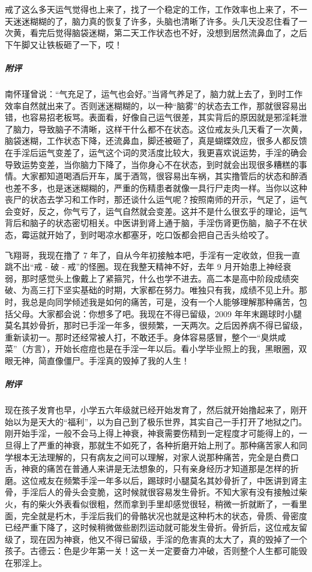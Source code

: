 \begin{case}
    戒了这么多天运气觉得也上来了，找了一个稳定的工作，工作效率也上来了，不一天迷迷糊糊的了，脑力真的恢复了许多，头脑也清晰了许多。头几天没忍住看了一次黄，看完后觉得脑袋迷糊，第二天工作状态也不好，没想到居然流鼻血了，之后下午脚又让铁板砸了一下，哎！
    \subparagraph{附评} 南怀瑾曾说：“气充足了，运气也会好。”当肾气养足了，脑力就上去了，到时工作效率自然就出来了。否则迷迷糊糊的，以一种“脑雾”的状态去工作，那就很容易出错，也容易招老板骂。表面看，好像自己运气很差，其实背后的原因就是邪淫耗泄了脑力，导致脑子不清晰，这样干什么都不在状态。这位戒友头几天看了一次黄，脑袋迷糊，工作状态下降，还流鼻血，脚还被砸了，真是蝴蝶效应，很多人都反馈在手淫后运气变差了，运气这个词的灵活度比较大，我更喜欢说运势，手淫的确会导致运势变差，当你脑力下降了，当你身心不在状态，到时就会出现很多糟糕的事情。大家都知道喝酒后开车，属于酒驾，很容易出车祸，其实撸管后的状态和醉酒也差不多，也是迷迷糊糊的，严重的伤精患者就像一具行尸走肉一样。当你以这种丧尸的状态去学习和工作时，那还谈什么运气呢？按照南师的开示，气足了，运气会变好，反之，你气亏了，运气自然就会变差。这并不是什么很玄乎的理论，运气背后和脑子的状态密切相关。中医讲到肾上通于脑，手淫伤肾更伤脑，脑子不在状态，霉运就开始了，到时喝凉水都塞牙，吃口饭都会把自己舌头给咬了。
\end{case}

\begin{case}
    飞翔哥，我现在撸了 7 年了，自从今年初接触本吧，手淫有一定收敛，但我一直跳不出“戒 - 破 - 戒”的怪圈。现在我整天精神不好，去年 9 月开始患上神经衰弱，那时感觉头上像戴上了紧箍咒，什么也学不进去。高二本是高中阶段成绩突破、为高三打下坚实基础的时期，大家都在努力。唯独只有我，成绩不见上升。那时，我总是向同学倾述我是如何的痛苦，可是，没有一个人能够理解那种痛苦，包括父母。大家都会说：你想多了吧。我现在不得已留级，2009 年年末踢球时小腿莫名其妙骨折，那时已手淫一年多，很频繁，一天两次。之后因养病不得已留级，重新读初一。那时还经常被人打，不敢还手。身体容易感冒，整个一“臭烘咸菜”（方言），开始长痘痘也是在手淫一年以后。看小学毕业照上的我，黑眼圈，双眼无神，简直像僵尸。手淫真的毁掉了我的人生！
    \subparagraph{附评} 现在孩子发育也早，小学五六年级就已经开始发育了，然后就开始撸起来了，刚开始以为是天大的“福利”，以为自己到了极乐世界，其实自己一手打开了地狱之门。刚开始手淫，一般不会马上得上神衰，神衰需要伤精到一定程度才可能得上的，一旦得上了严重的神衰，那就生不如死了，各种折磨开始上刑了。那种痛苦家人和同学根本无法理解的，只有病友之间可以理解，对家人说那种痛苦，完全是白费口舌，神衰的痛苦在普通人来讲是无法想象的，只有亲身经历才知道那是怎样的折磨。这位戒友在频繁手淫一年多以后，踢球时小腿莫名其妙骨折了，中医讲到肾主骨，手淫后人的骨头会变脆，这时候就很容易发生骨折。不知大家有没有接触过柴火，有的柴火外表看似很粗，然而拿到手里却感觉很轻，稍微一折就断了，一看里面，完全就是朽木，手淫后我们的骨骼状况也就是这种朽木的状态，骨质、骨密度已经严重下降了，这时候稍微做些剧烈运动就可能发生骨折。骨折后，这位戒友留级了，现在因为神衰，他又不得已留级，手淫的危害真的太大了，真的毁掉了一个孩子。古德云：色是少年第一关！这一关一定要奋力冲破，否则整个人生都可能毁在邪淫上。
\end{case}

